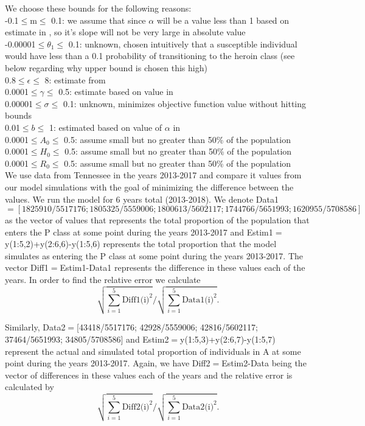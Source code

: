 \documentclass[12pt]{article}
\begin{document}
We choose these bounds for the following reasons: \\
-0.1$\leq$m$\leq$ 0.1: we assume that since $\alpha$ will be a value less than 1 based on estimate in \cite{Battista}, so it's slope will not be very large in absolute value \\
-0.00001$\leq$$\theta_1$$\leq$ 0.1: unknown, chosen intuitively that a susceptible individual would have less than a 0.1 probability of transitioning to the heroin class (see below regarding why upper bound is chosen this high) \\
0.8$\leq$$\epsilon$$\leq$ 8: estimate from \cite{Battista} \\
0.0001$\leq$$\gamma$$\leq$ 0.5: estimate based on value in \cite{Battista} \\
0.00001$\leq$$\sigma$$\leq$ 0.1: unknown, minimizes objective function value without hitting bounds \\
0.01$\leq$$b$$\leq$ 1: estimated based on value of $\alpha$ in \cite{Battista} \\
0.0001$\leq$$A_0$$\leq$ 0.5: assume small but no greater than 50\% of the population \\
0.0001$\leq$$H_0$$\leq$ 0.5: assume small but no greater than 50\% of the population \\
0.0001$\leq$$R_0$$\leq$ 0.5: assume small but no greater than 50\% of the population \\

We use data from Tennessee in the years 2013-2017 and compare it values from our model simulations with the goal of minimizing the difference between the values. We run the model for 6 years total (2013-2018). We denote Data1$=[1825910/5517176; 1805325/5559006; 1800613/5602117; 1744766/5651993; 1620955/5708586]$ as the vector of values that represents the total proportion of the population that enters the P class at some point during the years 2013-2017 and Estim1$=$y(1:5,2)+y(2:6,6)-y(1:5,6) represents the total proportion that the model simulates as entering the P class at some point during the years 2013-2017. The vector Diff1$=$Estim1-Data1 represents the difference in these values each of the years. In order to find the relative error we calculate 
$$\displaystyle \sqrt{\sum_{i=1}^{5} \text{Diff1(i)}^2} / \displaystyle \sqrt{\sum_{i=1}^{5} \text{Data1(i)}^2}. $$

Similarly, Data2$=$[43418/5517176; 42928/5559006; 42816/5602117; 37464/5651993; 34805/5708586] and
 Estim2$=$y(1:5,3)+y(2:6,7)-y(1:5,7) represent the actual and simulated total proportion of individuals in A at some point during the years 2013-2017. Again, we have Diff2$=$Estim2-Data being the vector of differences in these values each of the years and the relative error is calculated by 
 $$\displaystyle \sqrt{\sum_{i=1}^{5} \text{Diff2(i)}^2} / \displaystyle \sqrt{\sum_{i=1}^{5} \text{Data2(i)}^2}.$$
 
\end{document}
